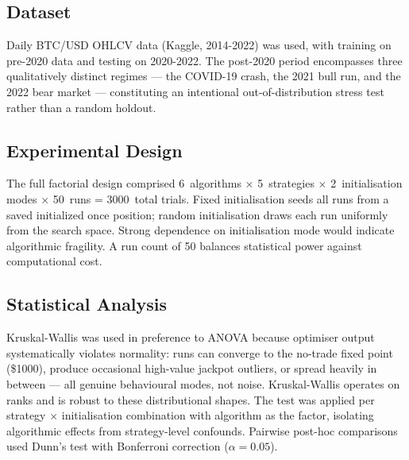 \label{sec:experiments}

\subsection{Dataset}

Daily BTC/USD OHLCV data (Kaggle, 2014-2022) was used, with training on pre-2020 
data and testing on 2020-2022. The post-2020 period encompasses three qualitatively 
distinct regimes — the COVID-19 crash, the 2021 bull run, and the 2022 bear market 
— constituting an intentional out-of-distribution stress test rather than a 
random holdout.

\subsection{Experimental Design}

The full factorial design comprised 6~algorithms $\times$ 5~strategies
$\times$ 2~initialisation modes $\times$ 50~runs = 3000~total trials. 
Fixed initialisation seeds all runs from a saved initialized once position; 
random initialisation draws each run uniformly from the search space. 
Strong dependence on initialisation mode would indicate algorithmic fragility. 
A run count of 50 balances statistical power against computational cost.

\subsection{Statistical Analysis}

Kruskal-Wallis was used in preference to ANOVA because optimiser output systematically 
violates normality: runs can converge to the no-trade fixed point (\$1000), 
produce occasional high-value jackpot outliers, or spread heavily in between — 
all genuine behavioural modes, not noise. Kruskal-Wallis operates on ranks and is 
robust to these distributional shapes. The test was applied per strategy $\times$ 
initialisation combination with algorithm as the factor, isolating algorithmic 
effects from strategy-level confounds. 
Pairwise post-hoc comparisons used Dunn's test with Bonferroni correction ($\alpha = 0.05$).